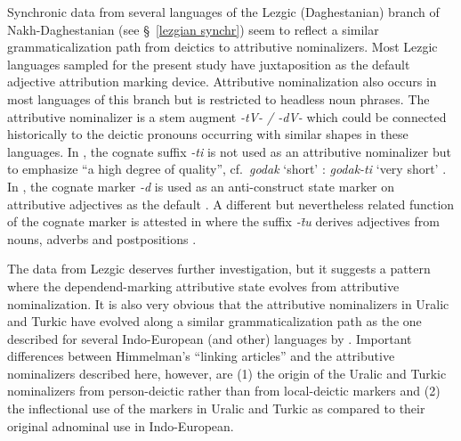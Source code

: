 {
Synchronic data from several languages of the Lezgic (Daghestanian) branch of Nakh-Daghestanian (see \S~\ref{lezgian synchr}) seem to reflect a similar grammaticalization path from deictics to attributive nominalizers. Most Lezgic languages sampled for the present study have juxtaposition as the default adjective attribution marking device. Attributive nominalization also occurs in most languages of this branch but is restricted to headless noun phrases. The attributive nominalizer is a stem augment \textit{-tV- / -dV-} which could be connected historically to the deictic pronouns occurring with similar shapes in these languages. In , the cognate suffix \textit{-ti} is not used as an attributive nominalizer but to emphasize “a high degree of quality”, cf.~\textit{godak} ‘short’ : \textit{godak-ti} ‘very short’ \citep[267]{alekseev1994b}. In , the cognate marker \textit{-d} is used as an anti-construct state marker on attributive adjectives as the default \citep[224]{alekseev1994a}. A different but nevertheless related function of the cognate marker is attested in  where the suffix \textit{-t̄u} derives adjectives from nouns, adverbs and postpositions \citep[318]{kibrik1994b}.

The data from Lezgic deserves further investigation, but it suggests a pattern where the dependend-marking attributive state evolves from attributive nominalization. It is also very obvious that the attributive nominalizers in Uralic and Turkic have evolved along a similar grammaticalization path as the one described for several Indo-European (and other) languages by \cite{himmelmann1997}. Important differences between Himmelman's “linking articles” and the attributive nominalizers described here, however, are (1) the origin of the Uralic and Turkic nominalizers from person-deictic rather than from local-deictic markers and (2) the inflectional use of the markers in Uralic and Turkic as compared to their original adnominal use in Indo-European.

}
